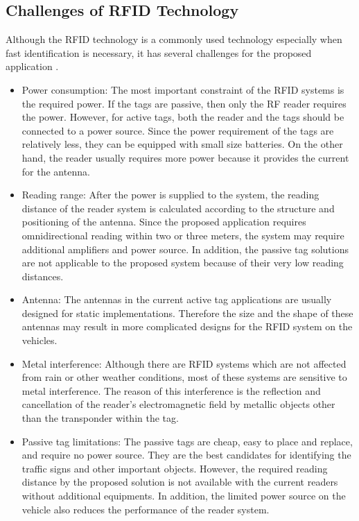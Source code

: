 \documentclass[a4paper,oneside,12pt]{report}
\begin{document}
\subsection{Challenges of RFID Technology}
Although the RFID technology is a commonly used technology especially when fast identification is necessary, it has several challenges for the proposed application \cite{finkenzeller_fundamentals_2010}. 
\begin{itemize}
	\item Power consumption: The most important constraint of the RFID systems is the required power. If the tags are passive, then only the RF reader requires the power. However, for active tags, both the reader and the tags should be connected to a power source. Since the power requirement of the tags are relatively less, they can be equipped with small size batteries. On the other hand, the reader usually requires more power because it provides the current for the antenna. 
	\item Reading range: After the power is supplied to the system, the reading distance of the reader system is calculated according to the structure and positioning of the antenna. Since the proposed application requires omnidirectional reading within two or three meters, the system may require additional amplifiers and power source. In addition, the passive tag solutions are not applicable to the proposed system because of their very low reading distances.
	\item Antenna: The antennas in the current active tag applications are usually designed for static implementations. Therefore the size and the shape of these antennas may result in more complicated designs for the RFID system on the vehicles.
	\item Metal interference: Although there are RFID systems which are not affected from rain or other weather conditions, most of these systems are sensitive to metal interference. The reason of this interference is the reflection and cancellation of the reader's electromagnetic field by metallic objects other than the transponder within the tag.
	\item Passive tag limitations: The passive tags are cheap, easy to place and replace, and require no power source. They are the best candidates for identifying the traffic signs and other important objects. However, the required reading distance by the proposed solution is not available with the current readers without additional equipments. In addition, the limited power source on the vehicle also reduces the performance of the reader system.	
\end{itemize}
\end{document}
